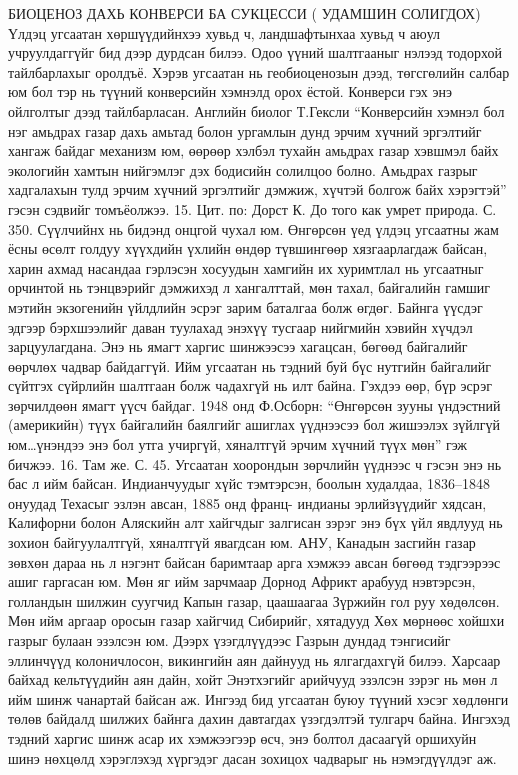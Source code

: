 БИОЦЕНОЗ ДАХЬ КОНВЕРСИ БА СУКЦЕССИ ( УДАМШИН СОЛИГДОХ)
Үлдэц угсаатан хөршүүдийнхээ хувьд ч, ландшафтынхаа хувьд ч аюул учруулдаггүйг бид дээр дурдсан билээ. Одоо үүний шалтгааныг нэлээд тодорхой тайлбарлахыг оролдъё. Хэрэв угсаатан нь геобиоценозын дээд, төгсгөлийн салбар юм бол тэр нь түүний конверсийн хэмнэлд орох ёстой. Конверси гэх энэ ойлголтыг дээд тайлбарласан.
Английн биолог Т.Гексли “Конверсийн хэмнэл бол нэг амьдрах газар дахь амьтад болон ургамлын дунд эрчим хүчний эргэлтийг хангаж байдаг механизм юм, өөрөөр хэлбэл тухайн амьдрах газар хэвшмэл байх экологийн хамтын нийгэмлэг дэх бодисийн солилцоо болно. Амьдрах газрыг хадгалахын тулд эрчим хүчний эргэлтийг дэмжиж, хүчтэй болгож байх хэрэгтэй” гэсэн сэдвийг томъёолжээ. 15. Цит. по: Дорст К. До того как умрет природа. С. 350.
Сүүлчийнх нь бидэнд онцгой чухал юм. Өнгөрсөн үед үлдэц угсаатны жам ёсны өсөлт голдуу хүүхдийн үхлийн өндөр түвшингөөр хязгаарлагдаж байсан, харин ахмад насандаа гэрлэсэн хосуудын хамгийн их хуримтлал нь угсаатныг орчинтой нь тэнцвэрийг дэмжихэд л хангалттай, мөн тахал, байгалийн гамшиг мэтийн экзогенийн үйлдлийн эсрэг зарим баталгаа болж өгдөг. Байнга үүсдэг эдгээр бэрхшээлийг даван туулахад энэхүү тусгаар нийгмийн хэвийн хүчдэл зарцуулагдана. Энэ нь ямагт харгис шинжээсээ хагацсан, бөгөөд байгалийг өөрчлөх чадвар байдаггүй. Ийм угсаатан нь тэдний буй бүс нутгийн байгалийг сүйтгэх сүйрлийн шалтгаан болж чадахгүй нь илт байна.
Гэхдээ өөр, бүр эсрэг зөрчилдөөн ямагт үүсч байдаг. 1948 онд Ф.Осборн: “Өнгөрсөн зууны үндэстний (америкийн) түүх байгалийн баялгийг ашиглах үүднээсээ бол жишээлэх зүйлгүй юм…үнэндээ энэ бол утга учиргүй, хяналтгүй эрчим хүчний түүх мөн” гэж бичжээ. 16. Там же. С. 45.
Угсаатан хоорондын зөрчлийн үүднээс ч гэсэн энэ нь бас л ийм байсан. Индианчуудыг хүйс тэмтэрсэн, боолын худалдаа, 1836–1848 онуудад Техасыг эзлэн авсан, 1885 онд франц- индианы эрлийзүүдийг хядсан, Калифорни болон Аляскийн алт хайгчдыг залгисан зэрэг энэ бүх үйл явдлууд нь зохион байгуулалтгүй, хяналтгүй явагдсан юм. АНУ, Канадын засгийн газар зөвхөн дараа нь л нэгэнт байсан баримтаар арга хэмжээ авсан бөгөөд тэдгээрээс ашиг гаргасан юм.
Мөн яг ийм зарчмаар Дорнод Африкт арабууд нэвтэрсэн, голландын шилжин суугчид Капын газар, цаашаагаа Зүржийн гол руу хөдөлсөн. Мөн ийм аргаар оросын газар хайгчид Сибирийг, хятадууд Хөх мөрнөөс хойшхи газрыг булаан эзэлсэн юм. Дээрх үзэгдлүүдээс Газрын дундад тэнгисийг эллинчүүд колоничлосон, викингийн аян дайнууд нь ялгагдахгүй билээ. Харсаар байхад кельтүүдийн аян дайн, хойт Энэтхэгийг арийчууд эзэлсэн зэрэг нь мөн л ийм шинж чанартай байсан аж. Ингээд бид угсаатан буюу түүний хэсэг хөдлөнги төлөв байдалд шилжих байнга дахин давтагдах үзэгдэлтэй тулгарч байна. Ингэхэд тэдний харгис шинж асар их хэмжээгээр өсч, энэ болтол дасаагүй оршихуйн шинэ нөхцөлд хэрэглэхэд хүргэдэг дасан зохицох чадварыг нь нэмэгдүүлдэг аж.
